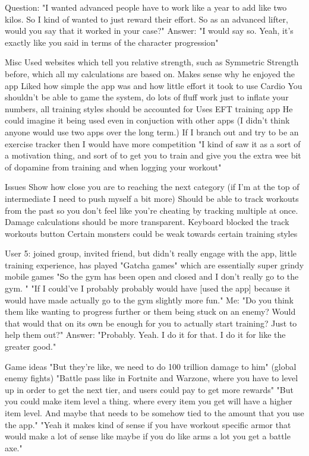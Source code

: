 \documentclass{l4proj}
\begin{document}
  Question: "I wanted advanced people have to work like a year to add like two kilos. So I kind of wanted to just reward their effort. So as an advanced lifter, would you say that it worked in your case?"
    Answer: "I would say so. Yeah, it's exactly like you said in terms of the character progression"

  Misc
    Used websites which tell you relative strength, such as Symmetric Strength before, which all my calculations are based on. Makes sense why he enjoyed the app
    Liked how simple the app was and how little effort it took to use
    Cardio 
    You shouldn't be able to game the system, do lots of fluff work just to inflate your numbers, all training styles should be accounted for 
    Uses EFT training app
    He could imagine it being used even in conjuction with other apps (I didn't think anyone would use two apps over the long term.)
    If I branch out and try to be an exercise tracker then I would have more competition
    "I kind of saw it as a sort of a motivation thing, and sort of to get you to train and give you the extra wee bit of dopamine from training and when logging your workout"

  Issues
    Show how close you are to reaching the next category (if I'm at the top of intermediate I need to push myself a bit more)
    Should be able to track workouts from the past so you don't feel like you're cheating by tracking multiple at once.
    Damage calculations should be more transparent.
    Keyboard blocked the track workouts button
    Certain monsters could be weak towards certain training styles

User 5: joined group, invited friend, but didn't really engage with the app, little training experience, has played "Gatcha games" which are essentially super grindy mobile games
 "So the gym has been open and closed and I don't really go to the gym. "
 "If I could've I probably probably would have [used the app] because it would have made actually go to the gym slightly more fun."
  Me: "Do you think them like wanting to progress further or them being stuck on an enemy? Would that would that on its own be enough for you to actually start training? Just to help them out?"
    Answer: "Probably. Yeah. I do it for that. I do it for like the greater good."

 Game ideas
   "But they're like, we need to do 100 trillion damage to him" (global enemy fights)
   "Battle pass like in Fortnite and Warzone, where you have to level up in order to get the next tier, and users could pay to get more rewards"
   "But you could make item level a thing. where every item you get will have a higher item level. And maybe that needs to be somehow tied to the amount that you use the app."
   "Yeah it makes kind of sense if you have workout specific armor that would make a lot of sense like maybe if you do like arms a lot you get a battle axe."
\end{document}
